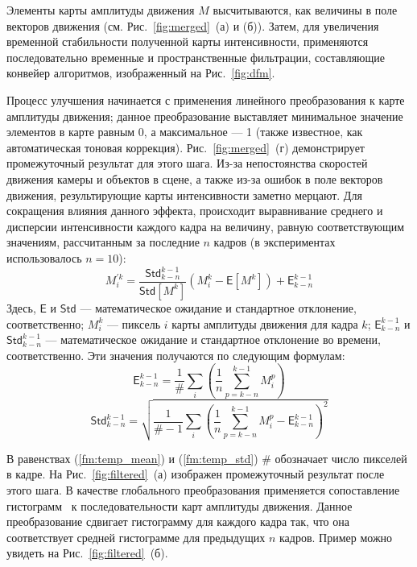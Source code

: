 \documentclass[14pt, a4paper]{extarticle}
\begin{document}
Элементы карты амплитуды движения $M$ высчитываются, как величины в поле векторов 
движения (см. Рис.~\ref{fig:merged}~(а) и (б)). Затем, для увеличения временной стабильности
полученной карты интенсивности, применяются последовательно временные и пространственные 
фильтрации, составляющие конвейер алгоритмов, изображенный на Рис.~\ref{fig:dfm}.

Процесс улучшения начинается с применения линейного преобразования к карте амплитуды движения;
данное преобразование выставляет минимальное значение элементов в карте равным 0, а максимальное --- 1
(также известное, как автоматическая тоновая коррекция). Рис.~\ref{fig:merged}~(г) демонстрирует
промежуточный результат для этого шага. Из-за непостоянства скоростей движения камеры 
и объектов в сцене, а также из-за ошибок в поле векторов движения, результирующие карты 
интенсивности заметно мерцают. Для сокращения влияния данного эффекта, происходит 
выравнивание среднего и дисперсии интенсивности каждого кадра на величину, равную 
соответствующим значениям, рассчитанным за последние $n$ кадров (в экспериментах использовалось $n = 10$):
\begin{equation}
M_{i}^{'k} = \frac{\mathsf{Std}_{k-n}^{k-1}}{\mathsf{Std}\left[M^k\right]} \left( M_i^k - \mathsf{E}\left[M^k\right]\right) + \mathsf{E}_{k-n}^{k-1}
\end{equation}
Здесь, $\mathsf{E}$ и $\mathsf{Std}$ --- математическое ожидание и стандартное отклонение, соответственно; 
$M^k_i$ --- пиксель $i$ карты амплитуды движения для кадра $k$; $\mathsf{E}_{k-n}^{k-1}$ и 
$\mathsf{Std}_{k-n}^{k-1}$ --- математическое ожидание и стандартное отклонение во времени, соответственно. 
Эти значения получаются по следующим формулам:
\begin{equation}
\mathsf{E}_{k-n}^{k-1} =  \frac{1}{\#} \sum_{i}\left(\frac{1}{n}\sum_{p=k-n}^{k-1}M_i^p\right)
\label{fm:temp_mean}
\end{equation}
\begin{equation}
\mathsf{Std}_{k-n}^{k-1} = \sqrt{\frac{1}{\# - 1} \sum_{i}\left(\frac{1}{n}\sum_{p=k-n}^{k-1}M_i^p - \mathsf{E}_{k-n}^{k-1}\right)^2}
\label{fm:temp_std}
\end{equation}



В равенствах (\ref{fm:temp_mean}) и (\ref{fm:temp_std}) $\#$ обозначает число пикселей в кадре.
На Рис.~\ref{fig:filtered}~(а) изображен промежуточный результат после этого шага. В качестве
глобального преобразования применяется сопоставление гистограмм~\cite{fecker2007time}
к последовательности карт амплитуды движения. Данное преобразование сдвигает 
гистограмму для каждого кадра так, что она соответствует средней гистограмме 
для предыдущих  $n$ кадров. Пример можно увидеть на Рис.~\ref{fig:filtered}~(б).
\end{document}

